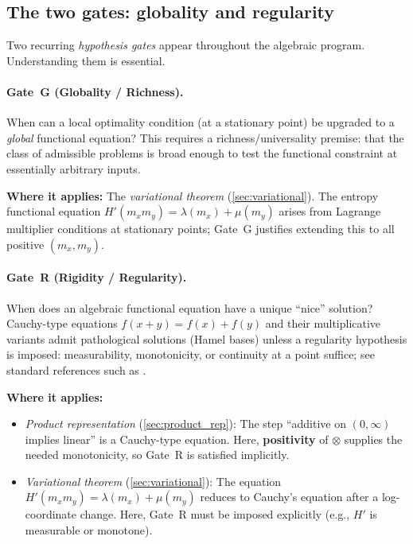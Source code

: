 \documentclass[11pt]{article}
\theoremstyle{definition}
\theoremstyle{remark}
\begin{document}
\subsection*{The two gates: globality and regularity}

Two recurring \emph{hypothesis gates} appear throughout the algebraic program.  Understanding them is essential.

\paragraph{Gate~G (Globality / Richness).}
When can a local optimality condition (at a stationary point) be upgraded to a
\emph{global} functional equation?  This requires a richness/universality premise:
that the class of admissible problems is broad enough to test the functional constraint
at essentially arbitrary inputs.

\textbf{Where it applies:} The \emph{variational theorem} (\cref{sec:variational}).
The entropy functional equation $H'(m_x m_y) = \lambda(m_x) + \mu(m_y)$ arises from
Lagrange multiplier conditions at stationary points; Gate~G justifies extending this
to all positive $(m_x, m_y)$.

\paragraph{Gate~R (Rigidity / Regularity).}
When does an algebraic functional equation have a unique ``nice'' solution?
Cauchy-type equations $f(x+y)=f(x)+f(y)$ and their multiplicative variants admit
pathological solutions (Hamel bases) unless a regularity hypothesis is imposed:
measurability, monotonicity, or continuity at a point suffice; see standard references such as
\cite{Aczel1966,Kuczma2009}.

\textbf{Where it applies:}
\begin{itemize}
\item \emph{Product representation} (\cref{sec:product_rep}): The step ``additive on $(0,\infty)$
  implies linear'' is a Cauchy-type equation.  Here, \textbf{positivity} of $\otimes$ supplies
  the needed monotonicity, so Gate~R is satisfied implicitly.
\item \emph{Variational theorem} (\cref{sec:variational}): The equation $H'(m_x m_y) = \lambda(m_x) + \mu(m_y)$
  reduces to Cauchy's equation after a log-coordinate change.  Here, Gate~R must be imposed
  explicitly (e.g., $H'$ is measurable or monotone).
\end{itemize}
\end{document}
